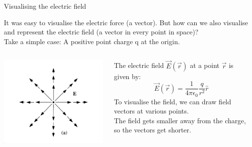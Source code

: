 \begin{frame}{Visualising the electric field}

It was easy to visualise the electric force (a vector).
But how can we also visualise and represent the electric field (a vector in every point in space)?\\
\vspace{0.2cm}
Take a simple case: A positive point charge q at the origin.\\

\begin{columns}
  \begin{column}{0.50\textwidth}
   \begin{center}
     \includegraphics[width=0.99\textwidth]{./images/schematics/electric_field_pos_point_charge.png}\\
   \end{center}
  \end{column}
  \begin{column}{0.50\textwidth}
     The electric field $\vec{E}(\vec{r})$ at a point $\vec{r}$ is given by:
      \begin{equation*}
        \vec{E}(\vec{r}) = \frac{1}{4\pi\epsilon_0} \frac{q}{r^2} \hat{r}
      \end{equation*}
     To visualise the field, we can draw field vectors at various points.\\
     \vspace{0.1cm}
     The field gets smaller away from the charge, so the vectors get shorter.\\
  \end{column}
\end{columns}

\end{frame}

